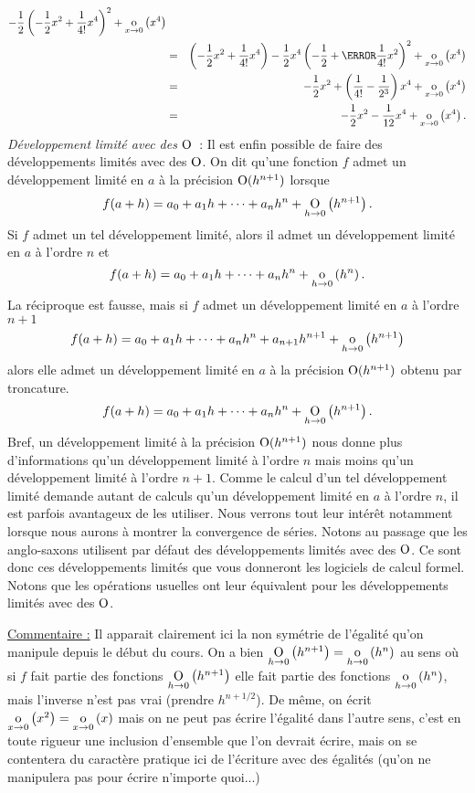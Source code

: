 \documentclass{magnoliaold}
\begin{document}
\begin{remarques}
\begin{eqnarray*}
             -\frac{1}{2}\p{-\frac{1}{2}x^2+\frac{1}{4!}x^4}^2+\petitozero{x}{x^4}\\
        &=& \p{-\frac{1}{2}x^2+\frac{1}{4!}x^4}
             -\frac{1}{2}x^4\p{-\frac{1}{2}+\cancel{\frac{1}{4!}x^2}}^2+
             \petitozero{x}{x^4}\\
        &=& -\frac{1}{2}x^2+\p{\frac{1}{4!}-\frac{1}{2^3}}x^4+\petitozero{x}{x^4}\\
        &=& -\frac{1}{2}x^2-\frac{1}{12}x^4+\petitozero{x}{x^4}.
        \end{eqnarray*}
        \remarque \textit{Développement limité avec des ${\rm O}$}~: Il est enfin possible de faire des développements limités avec des ${\rm O}$. On dit qu'une fonction $f$ admet un développement limité en $a$ à la précision ${\rm O}(h^{n+1})$ lorsque
        \[f(a+h)=a_0+a_1 h+\cdots+a_n h^n+\underset{h \rightarrow 0}{\text{O}}\left(h^{n+1}\right).\]
        Si $f$ admet un tel développement limité, alors il admet un développement limité en $a$ à l'ordre $n$ et
        \[f(a+h)=a_0+a_1 h+\cdots+a_n h^n+\underset{h \rightarrow 0}{\text{o}}\left(h^n\right).\]
        La réciproque est fausse, mais si $f$ admet un développement limité en $a$ à l'ordre $n+1$
        \[f(a+h)=a_0+a_1 h+\cdots+a_n h^n+a_{n+1} h^{n+1}+\underset{h \rightarrow 0}{\text{o}}\left(h^{n+1}\right)\]
        alors elle admet un développement limité en $a$ à la précision ${\rm O}(h^{n+1})$ obtenu par troncature.
        \[f(a+h)=a_0+a_1 h+\cdots+a_n h^n+\underset{h \rightarrow 0}{\text{O}}\left(h^{n+1}\right).\]
        Bref, un développement limité à la précision ${\rm O}(h^{n+1})$ nous donne plus d'informations qu'un développement limité à l'ordre $n$ mais moins qu'un développement limité à l'ordre $n+1$. Comme le calcul d'un tel développement limité demande autant de calculs qu'un développement limité en $a$ à l'ordre $n$, il est parfois avantageux de les utiliser. Nous verrons tout leur intérêt notamment lorsque nous aurons à montrer la convergence de séries. Notons au passage que les anglo-saxons utilisent par défaut des développements limités avec des ${\rm O}$. Ce sont donc ces développements limités que vous donneront les logiciels de calcul formel. Notons que les opérations usuelles ont leur équivalent pour les développements limités avec des ${\rm O}$.
        \begin{sol}
        \underline{Commentaire  :} Il apparait clairement ici la non symétrie de l'égalité qu'on manipule depuis le début du cours. On a bien $\underset{h \rightarrow 0}{\text{O}}\left(h^{n+1}\right)=\underset{h \rightarrow 0}{\text{o}}\left(h^n\right)$ au sens où si $f$ fait partie des fonctions $\underset{h \rightarrow 0}{\text{O}}\left(h^{n+1}\right)$ elle fait partie des fonctions $\underset{h \rightarrow 0}{\text{o}}\left(h^n\right)$, mais l'inverse n'est pas vrai (prendre $h^{n+1/2}$). De même, on écrit $\underset{x \rightarrow 0}{\text{o}}\left(x^2\right)=\underset{x \rightarrow 0}{\text{o}}\left(x\right)$ mais on ne peut pas écrire l'égalité dans l'autre sens, c'est en  toute rigueur une inclusion d'ensemble que l'on devrait écrire, mais on se contentera du caractère pratique ici de l'écriture avec des égalités (qu'on ne manipulera pas pour écrire n'importe quoi...)
        \end{sol}
        
         
        \end{remarques}
        
\end{document}
